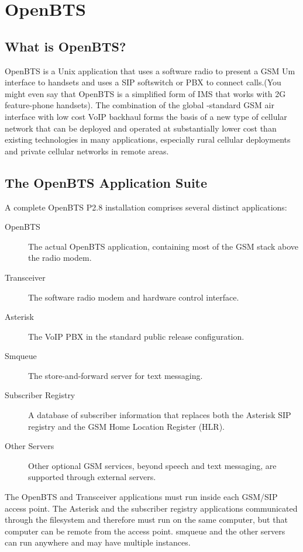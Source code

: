 \chapter{OpenBTS}

\section{What is OpenBTS?}
OpenBTS is a Unix application that uses a software radio to present a GSM Um interface to handsets and uses a SIP softswitch or PBX to connect calls.(You might even say that OpenBTS is a simplified form of IMS that works with 2G feature-phone handsets). The combination of the global -standard GSM air interface with low cost VoIP backhaul forms the basis of a new type of cellular network that can be deployed and operated at substantially lower cost than existing technologies in many applications, especially rural cellular deployments and private cellular networks in remote areas.

\section{The OpenBTS Application Suite}
A complete OpenBTS P2.8 installation comprises several distinct applications:

\begin{description}
\item[OpenBTS] The actual OpenBTS application, containing most of the GSM stack above the radio modem.
\item[Transceiver] The software radio modem and hardware control interface.
\item[Asterisk] The VoIP PBX in the standard public release configuration.
\item[Smqueue] The store-and-forward server for text messaging.
\item[Subscriber Registry] A database of subscriber information that replaces both the Asterisk SIP registry and the GSM Home Location Register (HLR).
\item[Other Servers] Other optional GSM services, beyond speech and text messaging, are supported through external servers.
\end{description}

The OpenBTS and Transceiver applications must run inside each GSM/SIP access point. The Asterisk and the subscriber registry applications communicated through the filesystem and therefore must run on the same computer, but that computer can be remote from the access point. smqueue and the other servers can run anywhere and may have multiple instances.

